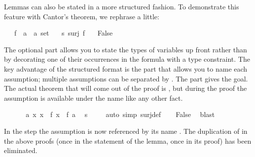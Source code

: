 \begin{isabellebody}
\begin{isamarkuptext}
Lemmas can also be stated in a more structured fashion. To demonstrate this
feature with Cantor's theorem, we rephrase 
a little:%
\end{isamarkuptext}%
\isamarkuptrue%
\isamarkupfalse%
\isanewline
\ \ \ f\ {}{}\ {}{}a\ {}\ {}a\ set{}\isanewline
\ \ \ s{}\ {}surj\ f{}\isanewline
\ \ \ {}False{}%
\isadelimproof
%
\endisadelimproof
%
\isatagproof
%
\begin{isamarkuptxt}%
The optional  part allows you to state the types of
variables up front rather than by decorating one of their occurrences in the
formula with a type constraint. The key advantage of the structured format is
the  part that allows you to name each assumption; multiple
assumptions can be separated by . The
 part gives the goal. The actual theorem that will come out of
the proof is , but during the proof the assumption
 is available under the name  like any other fact.%
\end{isamarkuptxt}%
\isamarkuptrue%
\isamarkupfalse%
\ {}\isanewline
\ \ \isamarkupfalse%
\ {}{}\ a{}\ {}x{}\ x\ {}\ f\ x{}\ {}\ f\ a{}\ \isamarkupfalse%
\ s\isanewline
\ \ \ \ \isamarkupfalse%
{}auto\ simp{}\ surj{}def{}\isanewline
\ \ \isamarkupfalse%
\ {}False{}\ \isamarkupfalse%
\ blast\isanewline
{}\isamarkupfalse%
%
\endisatagproof
{\isafoldproof}%
%
\isadelimproof
%
\endisadelimproof
%
\begin{isamarkuptext}%
In the  step the assumption  is now
referenced by its name . The duplication of  in the
above proofs (once in the statement of the lemma, once in its proof) has been
eliminated.


\end{isamarkuptext}
\end{isabellebody}
